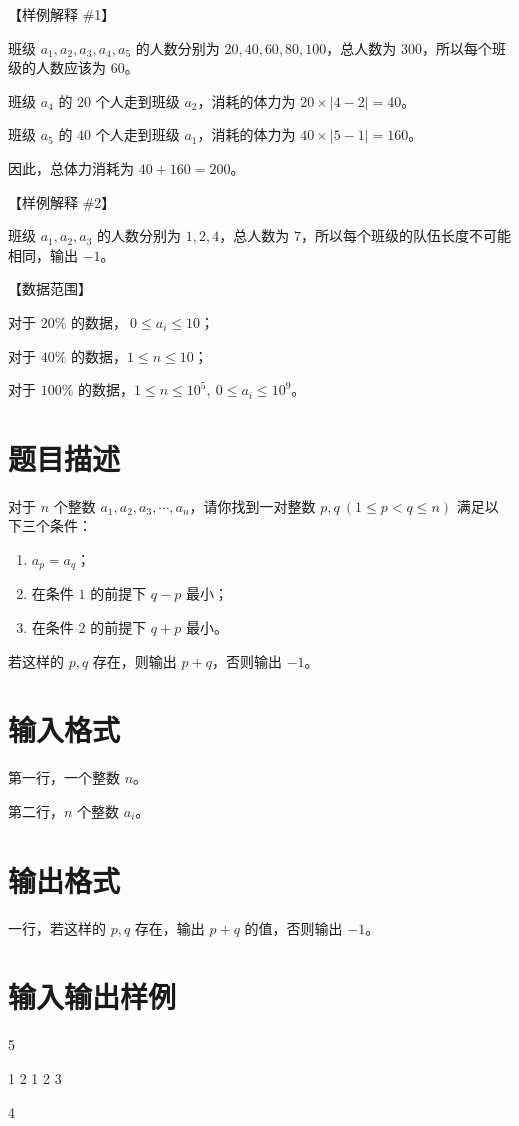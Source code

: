 \documentclass{../cpct/ctpro}
\begin{document}
【样例解释 \#1】

班级 $a_1,a_2,a_3,a_4,a_5$ 的人数分别为 $20,40,60,80,100$，总人数为 $300$，所以每个班级的人数应该为 $60$。

班级 $a_4$ 的 $20$ 个人走到班级 $a_2$，消耗的体力为 $20 \times |4-2| = 40$。

班级 $a_5$ 的 $40$ 个人走到班级 $a_1$，消耗的体力为 $40 \times |5-1| = 160$。

因此，总体力消耗为 $40+160=200$。

【样例解释 \#2】

班级 $a_1,a_2,a_3$ 的人数分别为 $1,2,4$，总人数为 $7$，所以每个班级的队伍长度不可能相同，输出 $-1$。

【数据范围】

对于 $20 \%$ 的数据，$~0 \leq a_i \leq 10$；

对于 $40 \%$ 的数据，$1 \leq n \leq 10$；

对于 $100 \%$ 的数据，$1 \leq n \leq {10}^5,~0 \leq a_i \leq {10}^9$。

\makeproblem
\section*{题目描述}

对于 $n$ 个整数 $a_1,a_2,a_3,\cdots,a_n$，请你找到一对整数 $p,q~(1 \leq p < q \leq n)$ 满足以下三个条件：

\begin{enumerate}
    \item $a_p = a_q$；
    \item 在条件 $1$ 的前提下 $q-p$ 最小；
    \item 在条件 $2$ 的前提下 $q+p$ 最小。
\end{enumerate}

若这样的 $p,q$ 存在，则输出 $p+q$，否则输出 $-1$。

\section*{输入格式}

第一行，一个整数 $n$。

第二行，$n$ 个整数 $a_i$。

\section*{输出格式}

一行，若这样的 $p,q$ 存在，输出 $p+q$ 的值，否则输出 $-1$。

\section*{输入输出样例}
\testcasetab
{
    5 \par
    1 2 1 2 3
}
{
    4
}
\end{document}
